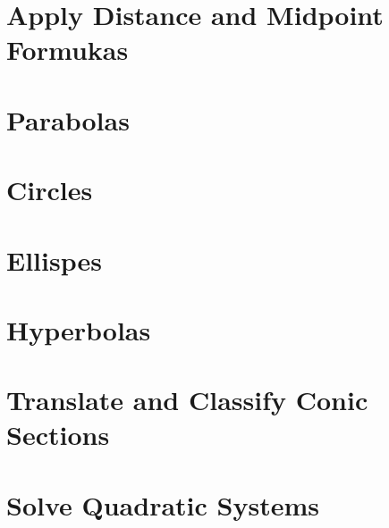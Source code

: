\documentclass[]{book}
\begin{document}
\hypertarget{apply-distance-and-midpoint-formukas}{%
\section{Apply Distance and Midpoint Formukas}\label{apply-distance-and-midpoint-formukas}}

\hypertarget{parabolas}{%
\section{Parabolas}\label{parabolas}}

\hypertarget{circles}{%
\section{Circles}\label{circles}}

\hypertarget{ellispes}{%
\section{Ellispes}\label{ellispes}}

\hypertarget{hyperbolas}{%
\section{Hyperbolas}\label{hyperbolas}}

\hypertarget{translate-and-classify-conic-sections}{%
\section{Translate and Classify Conic Sections}\label{translate-and-classify-conic-sections}}

\hypertarget{solve-quadratic-systems}{%
\section{Solve Quadratic Systems}\label{solve-quadratic-systems}}


\end{document}
